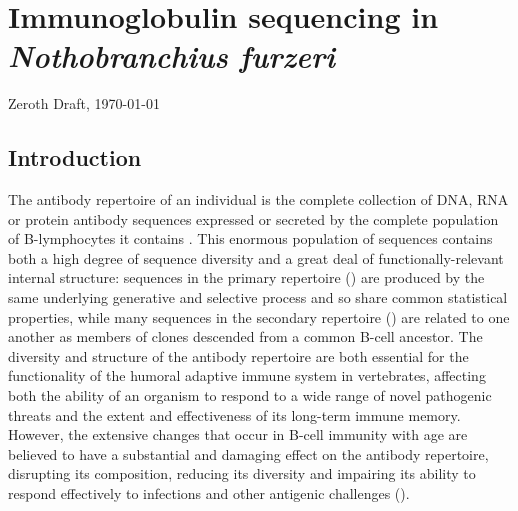 
\chapter{Immunoglobulin sequencing in \textit{Nothobranchius furzeri}} 
\label{chap:igseq} 
\onehalfspacing

\ifdefineChapter
	{\LARGE Zeroth Draft, \today}
\fi

\pagebreak

\section{Introduction}
\label{sec:igseq_intro}

The antibody repertoire of an individual is the complete collection of DNA, RNA or protein antibody sequences expressed or secreted by the complete population of B-lymphocytes it contains \parencite{miho2018computational}. This enormous population of sequences contains both a high degree of sequence diversity and a great deal of functionally-relevant internal structure: \naive sequences in the primary repertoire () are produced by the same underlying generative and selective process and so share common statistical properties, while many sequences in the secondary repertoire () are related to one another as members of clones descended from a common \naive B-cell ancestor. The diversity and structure of the antibody repertoire are both essential for the functionality of the humoral adaptive immune system in vertebrates, affecting both the ability of an organism to respond to a wide range of novel pathogenic threats and the extent and effectiveness of its long-term immune memory. However, the extensive changes that occur in B-cell immunity with age are believed to have a substantial and damaging effect on the antibody repertoire, disrupting its composition, reducing its diversity and impairing its ability to respond effectively to infections and other antigenic challenges ().

